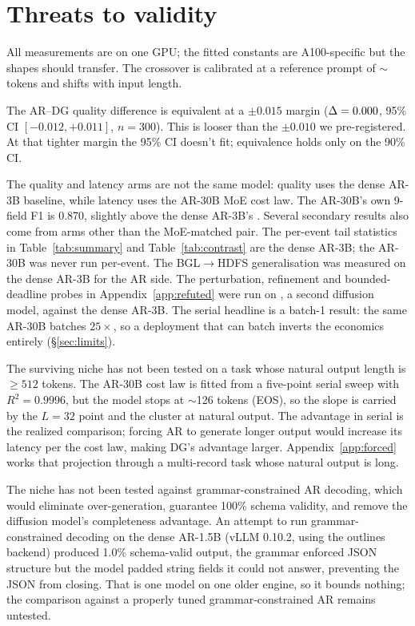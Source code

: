 \section{Threats to validity}
\label{sec:threats}

All measurements are on one GPU; the fitted constants are A100-specific
but the shapes should transfer. The crossover is calibrated at a
reference prompt of $\sim$\,tokens and shifts with input
length.

The AR--DG quality difference is equivalent at a $\pm 0.015$ margin
($\Delta = 0.000$, 95\% CI $[-0.012, +0.011]$, $n = 300$).
This is looser than the $\pm 0.010$ we pre-registered. At that
tighter margin the 95\% CI doesn't fit; equivalence holds only on
the 90\% CI.

The quality and latency arms are not the same model: quality uses the
dense AR-3B baseline, while latency uses the AR-30B MoE cost law.
The AR-30B's own 9-field F1 is 0.870, slightly above the dense
AR-3B's \arThreeBFnine. Several secondary results also come from arms
other than the MoE-matched pair. The per-event tail statistics in
Table~\ref{tab:summary} and Table~\ref{tab:contrast} are the dense
AR-3B; the AR-30B was never run per-event. The BGL$\to$HDFS
generalisation was measured on the dense AR-3B for the AR side. The
perturbation, refinement and bounded-deadline probes in
Appendix~\ref{app:refuted} were run on \LLaDA, a second diffusion
model, against the dense AR-3B. The serial headline is a batch-1
result: the same AR-30B batches $25\times$, so a deployment that can
batch inverts the economics entirely (\S\ref{sec:limits}).

The surviving niche has not been tested on a task whose natural output
length is $\geq 512$ tokens. The AR-30B cost law is fitted from a
five-point serial sweep with $R^2 = 0.9996$, but the model stops at
$\sim$126 tokens (EOS), so the slope is carried by the $L{=}32$ point
and the cluster at natural output. The advantage in serial is the
realized comparison; forcing AR to generate longer output would
increase its latency per the cost law, making DG's advantage larger.
Appendix~\ref{app:forced} works that projection through a multi-record
task whose natural output is long.

The niche has not been tested against grammar-constrained AR decoding,
which would eliminate over-generation, guarantee 100\% schema
validity, and remove the diffusion model's completeness advantage. An
attempt to run grammar-constrained decoding on the dense AR-1.5B
(vLLM 0.10.2, using the outlines~\cite{outlines2024} backend) produced
1.0\% schema-valid output, the grammar enforced JSON structure but
the model padded string fields it could not answer, preventing the JSON
from closing. That is one model on one older engine, so it bounds
nothing; the comparison against a properly tuned grammar-constrained
AR remains untested.

